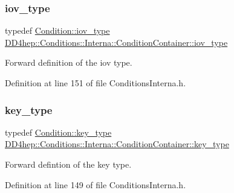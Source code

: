 \subsubsection{\texorpdfstring{iov\+\_\+type}{iov\_type}}
{\footnotesize\ttfamily typedef \hyperlink{class_d_d4hep_1_1_conditions_1_1_condition_ad84300e226b2085ec5e9db7f47be5539}{Condition\+::iov\+\_\+type} \hyperlink{class_d_d4hep_1_1_conditions_1_1_interna_1_1_condition_container_aa697bd92da7a05031b5eef63bb9f000b}{D\+D4hep\+::\+Conditions\+::\+Interna\+::\+Condition\+Container\+::iov\+\_\+type}}



Forward definition of the iov type. 



Definition at line 151 of file Conditions\+Interna.\+h.

\hypertarget{class_d_d4hep_1_1_conditions_1_1_interna_1_1_condition_container_a7a4545b4b0536565feb7346bd97c63fa}{}\label{class_d_d4hep_1_1_conditions_1_1_interna_1_1_condition_container_a7a4545b4b0536565feb7346bd97c63fa} 
\subsubsection{\texorpdfstring{key\+\_\+type}{key\_type}}
{\footnotesize\ttfamily typedef \hyperlink{class_d_d4hep_1_1_conditions_1_1_condition_a7528efa762e8cc072ef80ea67c3531f9}{Condition\+::key\+\_\+type} \hyperlink{class_d_d4hep_1_1_conditions_1_1_interna_1_1_condition_container_a7a4545b4b0536565feb7346bd97c63fa}{D\+D4hep\+::\+Conditions\+::\+Interna\+::\+Condition\+Container\+::key\+\_\+type}}



Forward defintion of the key type. 



Definition at line 149 of file Conditions\+Interna.\+h.

\hypertarget{class_d_d4hep_1_1_conditions_1_1_interna_1_1_condition_container_a2a8452e68d48eb94553607e7d7ae13f6}{}\label{class_d_d4hep_1_1_conditions_1_1_interna_1_1_condition_container_a2a8452e68d48eb94553607e7d7ae13f6} 
